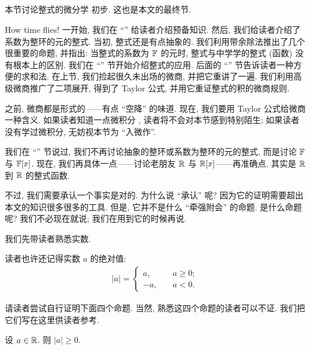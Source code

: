 \subsection*{\IntroductionToDifferentialCalculusOnPolynomials}
\markright{\IntroductionToDifferentialCalculusOnPolynomials}

本节讨论整式的微分学  初步. 这也是本文的最终节.

How time flies! 一开始, 我们在 ``\Prerequisites '' 给读者介绍预备知识. 然后, 我们给读者介绍了系数为整环的元的整式. 当初, 整式还是有点抽象的. 我们利用带余除法推出了几个很重要的命题, 并指出: 当整式的系数为 $\mathbb{F}$ 的元时, 整式与中学学的整式 (函数) 没有根本上的区别. 我们在 ``\Interpolation '' 节开始介绍整式的应用. 后面的 ``\SummationFormulae '' 节告诉读者一种方便的求和法. 在上节, 我们捡起很久未出场的微商, 并把它重讲了一遍. 我们利用高级微商推广了二项展开, 得到了 Taylor 公式, 并用它重证整式的积的微商规则.

之前, 微商都是形式的——有点 ``空降'' 的味道. 现在, 我们要用 Taylor 公式给微商一种含义. 如果读者知道一点微积分 , 读者将不会对本节感到特别陌生; 如果读者没有学过微积分, 无妨视本节为 ``入微作''.

我们在 ``\PolynomialsOverF '' 节说过, 我们不再讨论抽象的整环或系数为整环的元的整式, 而是讨论 $\mathbb{F}$ 与 $\mathbb{F}[x]$. 现在, 我们再具体一点——讨论老朋友 $\mathbb{R}$ 与 $\mathbb{R}[x]$——再准确点, 其实是 $\mathbb{R}$ 到 $\mathbb{R}$ 的整式函数.

不过, 我们需要承认一个事实是对的. 为什么说 ``承认'' 呢? 因为它的证明需要超出本文的知识很多很多的工具. 但是, 它并不是什么 ``牵强附会'' 的命题. 是什么命题呢? 我们不必现在就说; 我们在用到它的时候再说.

我们先带读者熟悉实数.

读者也许还记得实数 $a$ 的绝对值:
\begin{align*}
    |a| = \begin{cases}
        a,  & \quad a \geq 0; \\
        -a, & \quad a < 0.
    \end{cases}
\end{align*}

请读者尝试自行证明下面四个命题. 当然, 熟悉这四个命题的读者可以不证. 我们把它们写在这里供读者参考.

\begin{proposition}
    设 $a \in \mathbb{R}$. 则 $|a| \geq 0$.
\end{proposition}


